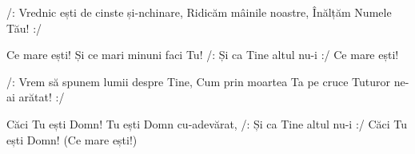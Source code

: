 \beginverse
/: Vrednic ești de cinste și-nchinare,
Ridicăm mâinile noastre,
Înălțăm Numele Tău! :/
\endverse

\beginchorus
Ce mare ești!
Și ce mari minuni faci Tu!
/: Și ca Tine altul nu-i :/
Ce mare ești!
\endchorus

\beginverse
/: Vrem să spunem lumii despre Tine,
Cum prin moartea Ta pe cruce
Tuturor ne-ai arătat! :/
\endverse

\beginchorus
Căci Tu ești Domn!
Tu ești Domn cu-adevărat,
/: Și ca Tine altul nu-i :/
Căci Tu ești Domn! (Ce mare ești!)
\endchorus
\endsong